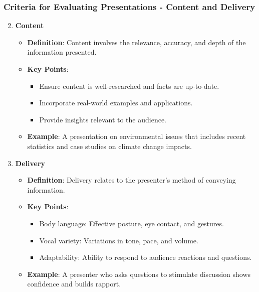 \documentclass[aspectratio=169]{beamer}
\begin{document}
\begin{frame}[fragile]
    \frametitle{Criteria for Evaluating Presentations - Content and Delivery}
    \begin{enumerate}
        \setcounter{enumi}{1}
        \item \textbf{Content}
            \begin{itemize}
                \item \textbf{Definition}: Content involves the relevance, accuracy, and depth of the information presented.
                \item \textbf{Key Points}:
                    \begin{itemize}
                        \item Ensure content is well-researched and facts are up-to-date.
                        \item Incorporate real-world examples and applications.
                        \item Provide insights relevant to the audience.
                    \end{itemize}
                \item \textbf{Example}: A presentation on environmental issues that includes recent statistics and case studies on climate change impacts.
            \end{itemize}

        \item \textbf{Delivery}
            \begin{itemize}
                \item \textbf{Definition}: Delivery relates to the presenter’s method of conveying information.
                \item \textbf{Key Points}:
                    \begin{itemize}
                        \item Body language: Effective posture, eye contact, and gestures.
                        \item Vocal variety: Variations in tone, pace, and volume.
                        \item Adaptability: Ability to respond to audience reactions and questions.
                    \end{itemize}
                \item \textbf{Example}: A presenter who asks questions to stimulate discussion shows confidence and builds rapport.
            \end{itemize}
    \end{enumerate}
\end{frame}
\end{document}

